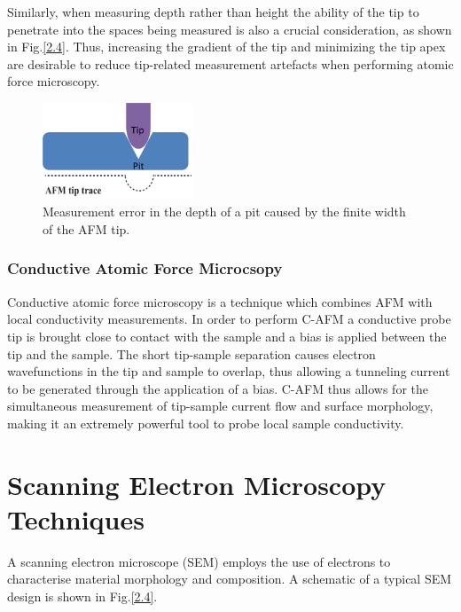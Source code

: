 Similarly, when measuring depth rather than height the ability of the tip to penetrate into the spaces being measured is also a crucial consideration, as shown in Fig.\ref{2.4}. Thus, increasing the gradient of the tip and minimizing the tip apex are desirable to reduce tip-related measurement artefacts when performing atomic force microscopy.

\begin{figure}[h]
	\centering
	\includegraphics[width=0.4\textwidth]{Figs/Ch2/afm3.png}
	\caption {Measurement error in the depth of a pit caused by the finite width of the AFM tip.}
\end{figure}
\FloatBarrier

\subsubsection{Conductive Atomic Force Microcsopy}

Conductive atomic force microscopy  is a technique which combines AFM with local conductivity measurements. In order to perform C-AFM a conductive probe tip is brought close to contact with the sample and a bias is applied between the tip and the sample. The short tip-sample separation causes electron wavefunctions in the tip and sample to overlap, thus allowing a tunneling current to be generated through the application of a bias. C-AFM thus allows for the simultaneous measurement of tip-sample current flow and surface morphology, making it an extremely powerful tool to probe local sample conductivity. 




\section{Scanning Electron Microscopy Techniques}

A scanning electron microscope   (SEM) employs the use of electrons to characterise material morphology and composition. A schematic of a typical SEM design is shown in Fig.\ref{2.4}.

